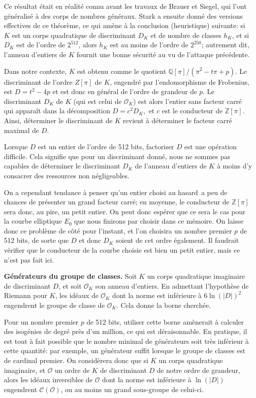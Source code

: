 \documentclass[11pt,a4paper]{article}
\newcommand{\Z}{\mathbb{Z}}
\newcommand{\Q}{\mathbb{Q}}
\renewcommand{\O}{\mathcal{O}}
\newcommand{\Cl}{\mathcal{C}}
\renewcommand{\v}{\vspace{5mm}}
\theoremstyle{definition}
\begin{document}
Ce résultat était en réalité connu avant les travaux de Brauer et Siegel, qui l'ont généralisé à des corps de nombres généraux. Stark a ensuite donné des versions effectives de ce théorème, ce qui amène à la conclusion (heuristique) suivante: si $K$ est un corps quadratique de discriminant $D_K$ et de nombre de classes $h_K$, et si $D_K$ est de l'ordre de $2^{512}$, alors $h_K$ est au moins de l'ordre de $2^{250}$; autrement dit, l'anneau d'entiers de $K$ fournit une bonne sécurité au vu de l'attaque précédente.

\v
Dans notre contexte, $K$ est obtenu comme le quotient $\Q[\pi]/(\pi^2  - t\pi + p)$. Le discriminant de l'ordre $Z[\pi]$ de $K$, engendré par l'endomorphisme de Frobenius, est $D = t^2 - 4 p$ et est donc en général de l'ordre de grandeur de $p$. Le discriminant $D_K$ de $K$ (qui est celui de $\O_K$) est alors l'entier sans facteur carré qui apparaît dans la décomposition $D = c^2 D_K,$ et $c$ est le conducteur de $\Z[\pi]$. Ainsi, déterminer le discriminant de $K$ revient à déterminer le facteur carré maximal de $D$.

Lorsque $D$ est un entier de l'ordre de 512 bits, factoriser $D$ est une opération difficile. Cela signifie que pour un discriminant donné, nous ne sommes pas capables de déterminer le discriminant $D_K$ de l'anneau d'entiers de $K$ à moins d'y consacrer des ressources non négligeables.

On a cependant tendance à penser qu'un entier choisi \og au hasard\fg\ a peu de chances de présenter un grand facteur carré; en moyenne, le conducteur de $\Z[\pi]$ sera donc, au pire, un petit entier. On peut donc espérer que ce sera le cas pour la courbe elliptique $E_0$ que nous finirons par choisir dans ce mémoire. On laisse donc ce problème de côté pour l'instant, et l'on choisira un nombre premier $p$ de 512 bits, de sorte que $D$ et donc $D_K$ soient de cet ordre également. Il faudrait vérifier que le conducteur de la courbe choisie est bien un petit entier, mais ce n'est pas fait ici.

\v
\textbf{Générateurs du groupe de classes.}
Soit $K$ un corps quadratique imaginaire de discriminant $D$, et soit $\O_K$ son anneau d'entiers. En admettant l'hypothèse de Riemann pour $K$, les idéaux de $\O_K$ dont la norme est inférieure à $6\ln(|D|)^2$ engendrent le groupe de classe de $\O_K$. Cela donne la borne cherchée.

Pour un nombre premier $p$ de 512 bits, utiliser cette borne amènerait à calculer des isogénies de degré près d'un million, ce qui est déraisonnable. En pratique, il est tout à fait possible que le nombre minimal de générateurs soit très inférieur à cette quantité: par exemple, un générateur suffit lorsque le groupe de classes est de cardinal premier. On considèrera donc que si $K$ un corps quadratique imaginaire, et $\O$ un ordre de $K$ de discriminant $D$ de notre ordre de grandeur, alors les idéaux inversibles de $\O$ dont la norme est inférieure à $\ln(|D|)$ engendrent $\Cl(\O)$, ou au moins un grand sous-groupe de celui-ci.
\end{document}
